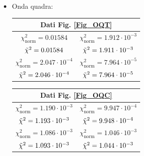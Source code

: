 \documentclass{article}[a4paper, oneside,11pt]
\begin{document}
    \begin{itemize}
    
        \item Onda quadra:
            \begin{center}
    \begin{tabular}{|c|c|}
        \hline
        \multicolumn{2}{|c|}{Dati Fig. \ref{Fig_OQT}}\\
        \hline
        $\chi^2_{\text{norm}} = 0.01584$ & $\chi^2_{\text{norm}} = 1.912\cdot10^{-3}$ \\
        $\Tilde{\chi}^2 = 0.01584 $ & $\Tilde{\chi}^2 = 1.911\cdot10^{-3}$\\
        \hline
        $\chi^2_{\text{norm}} = 2.047\cdot10^{-4}$ & $\chi^2_{\text{norm}} = 7.964\cdot10^{-5}$ \\
        $\Tilde{\chi}^2 = 2.046\cdot10^{-4}$ & $\Tilde{\chi}^2 =7.964\cdot10^{-5}$\\
        \hline
    \end{tabular}
    
    \begin{tabular}{|c|c|}
        \hline
        \multicolumn{2}{|c|}{Dati Fig. \ref{Fig_OQC}}\\
        \hline
        $\chi^2_{\text{norm}} = 1.190\cdot10^{-3}$ & $\chi^2_{\text{norm}} = 9.947\cdot10^{-4}$\\
        $\Tilde{\chi}^2 = 1.193\cdot10^{-3}$ & $\Tilde{\chi}^2 = 9.948\cdot10^{-4}$\\
        \hline
        $\chi^2_{\text{norm}} = 1.086\cdot10^{-3}$ & $\chi^2_{\text{norm}} = 1.046\cdot10^{-3}$\\
        $\Tilde{\chi}^2 = 1.093\cdot10^{-3}$ & $\Tilde{\chi}^2 = 1.044\cdot10^{-3}$\\
        \hline
    \end{tabular}
            \end{center}


\end{itemize}
\end{document}
